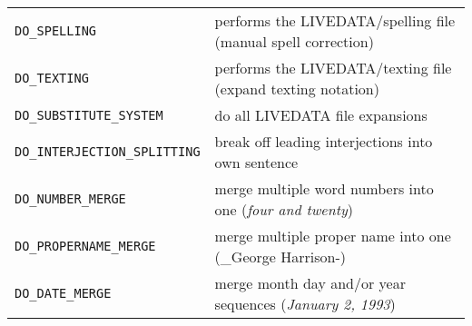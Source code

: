 \documentclass[]{article}
\begin{document}
\begin{longtable}[]{@{}ll@{}}
\begin{minipage}[t]{0.07\columnwidth}
\texttt{DO\_SPELLING}\strut
\end{minipage} & \begin{minipage}[t]{0.10\columnwidth}\raggedright\strut
performs the LIVEDATA/spelling file (manual spell correction)\strut
\end{minipage}\tabularnewline
\begin{minipage}[t]{0.07\columnwidth}\raggedright\strut
\texttt{DO\_TEXTING}\strut
\end{minipage} & \begin{minipage}[t]{0.10\columnwidth}\raggedright\strut
performs the LIVEDATA/texting file (expand texting notation)\strut
\end{minipage}\tabularnewline
\begin{minipage}[t]{0.07\columnwidth}\raggedright\strut
\texttt{DO\_SUBSTITUTE\_SYSTEM}\strut
\end{minipage} & \begin{minipage}[t]{0.10\columnwidth}\raggedright\strut
do all LIVEDATA file expansions\strut
\end{minipage}\tabularnewline
\begin{minipage}[t]{0.07\columnwidth}\raggedright\strut
\texttt{DO\_INTERJECTION\_SPLITTING}\strut
\end{minipage} & \begin{minipage}[t]{0.10\columnwidth}\raggedright\strut
break off leading interjections into own sentence\strut
\end{minipage}\tabularnewline
\begin{minipage}[t]{0.07\columnwidth}\raggedright\strut
\texttt{DO\_NUMBER\_MERGE}\strut
\end{minipage} & \begin{minipage}[t]{0.10\columnwidth}\raggedright\strut
merge multiple word numbers into one (\emph{four and twenty})\strut
\end{minipage}\tabularnewline
\begin{minipage}[t]{0.07\columnwidth}\raggedright\strut
\texttt{DO\_PROPERNAME\_MERGE}\strut
\end{minipage} & \begin{minipage}[t]{0.10\columnwidth}\raggedright\strut
merge multiple proper name into one (\_George Harrison-)\strut
\end{minipage}\tabularnewline
\begin{minipage}[t]{0.07\columnwidth}\raggedright\strut
\texttt{DO\_DATE\_MERGE}\strut
\end{minipage} & \begin{minipage}[t]{0.10\columnwidth}\raggedright\strut
merge month day and/or year sequences (\emph{January 2, 1993})\strut
\end{minipage}\tabularnewline
\bottomrule
\end{longtable}
\end{document}
